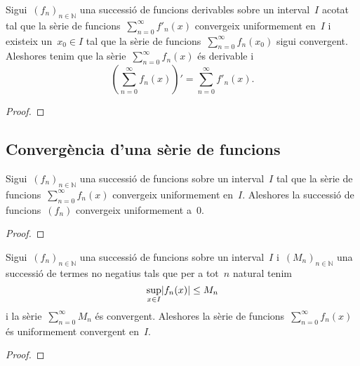 \documentclass[../../main.tex]{subfiles}
\begin{document}
    \begin{theorem}
        \label{thm:condició per la derivabilitat d'una sèrie de funcions}
        Sigui~\((f_{n})_{n\in\mathbb{N}}\) una successió de funcions derivables sobre un interval~\(I\) acotat tal que la sèrie de funcions~\(\sum_{n=0}^{\infty}f'_{n}(x)\) convergeix uniformement en~\(I\) i existeix un~\(x_{0}\in I\) tal que la sèrie de funcions~\(\sum_{n=0}^{\infty}f_{n}(x_{0})\) sigui convergent.
        Aleshores tenim que la sèrie~\(\sum_{n=0}^{\infty}f_{n}(x)\) és derivable i
        \[
            \left(\sum_{n=0}^{\infty}f_{n}(x)\right)'=\sum_{n=0}^{\infty}f'_{n}(x).
        \]
        \begin{proof}
        \end{proof}
    \end{theorem}
    \subsection{Convergència d'una sèrie de funcions}
    \begin{proposition}
        \label{prop:si una sêrie de funcions convergeix uniformement aleshores la successió de funcions convergeix uniformement a 0}
        Sigui~\((f_{n})_{n\in\mathbb{N}}\) una successió de funcions sobre un interval~\(I\) tal que la sèrie de funcions~\(\sum_{n=0}^{\infty}f_{n}(x)\) convergeix uniformement en~\(I\).
        Aleshores la successió de funcions~\((f_{n})\) convergeix uniformement a~\(0\).
        \begin{proof}
        \end{proof}
    \end{proposition}
    \begin{theorem}
        \label{thm:criteri M de Weierstrass}
        Sigui~\((f_{n})_{n\in\mathbb{N}}\) una successió de funcions sobre un interval~\(I\) i~\((M_{n})_{n\in\mathbb{N}}\) una successió de termes no negatius tals que per a tot~\(n\) natural tenim
        \[
            \sup_{x\in I}\abs{f_{n}(x)}\leq M_{n}
        \]
        i la sèrie~\(\sum_{n=0}^{\infty}M_{n}\) és convergent.
        Aleshores la sèrie de funcions~\(\sum_{n=0}^{\infty}f_{n}(x)\) és uniformement convergent en~\(I\).
        \begin{proof}
        \end{proof}
    \end{theorem}
\end{document}
